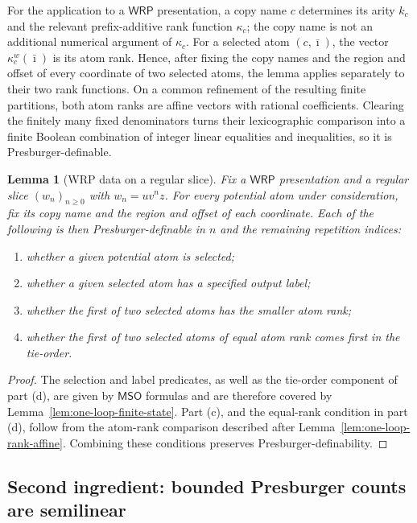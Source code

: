 \documentclass[11pt]{article}
\newtheorem{lemma}[theorem]{Lemma}
\theoremstyle{definition}
\newcommand{\WRP}{\mathsf{WRP}}
\newcommand{\MSO}{\mathsf{MSO}}
\begin{document}
For the application to a $\WRP$ presentation, a copy name $c$ determines its
arity $k_c$ and the relevant prefix-additive rank function $\kappa_c$; the copy
name is not an additional numerical argument of $\kappa_c$.  For a selected
atom $(c,\bar\imath)$, the vector $\kappa_c^w(\bar\imath)$ is its atom rank.
Hence, after fixing the copy names and the region and offset of every coordinate
of two selected atoms, the lemma applies separately to their two rank functions.
On a common refinement of the resulting finite partitions, both atom ranks are
affine vectors with rational coefficients.  Clearing the finitely many fixed
denominators turns their lexicographic comparison into a finite Boolean
combination of integer linear equalities and inequalities, so it is
Presburger-definable.

\begin{lemma}[WRP data on a regular slice]
\label{lem:one-loop-presburger}
Fix a $\WRP$ presentation and a regular slice $(w_n)_{n\ge0}$ with
$w_n=uv^nz$.  For every potential
atom under consideration, fix its copy name and the region and offset of each
coordinate.  Each of the following is then Presburger-definable in $n$ and the
remaining repetition indices:
\begin{enumerate}[label=(\alph*)]
\item whether a given potential atom is selected;
\item whether a given selected atom has a specified output label;
\item whether the first of two selected atoms has the smaller atom rank;
\item whether the first of two selected atoms of equal atom rank comes first in
the tie-order.
\end{enumerate}
\end{lemma}

\begin{proof}
The selection and label predicates, as well as the tie-order component of part
(d), are given by $\MSO$ formulas and are therefore covered by
Lemma~\ref{lem:one-loop-finite-state}.  Part (c), and the equal-rank condition
in part (d), follow from the atom-rank comparison described after
Lemma~\ref{lem:one-loop-rank-affine}.  Combining these conditions preserves
Presburger-definability.
\end{proof}

\subsection{Second ingredient: bounded Presburger counts are semilinear}
\end{document}
